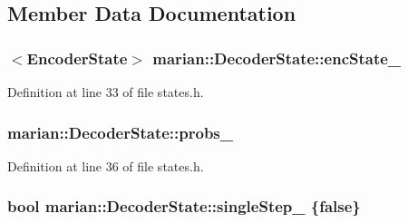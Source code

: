 \subsection{Member Data Documentation}
\subsubsection[{\texorpdfstring{enc\+State\+\_\+}{encState_}}]{$<${\bf Encoder\+State}$>$ marian\+::\+Decoder\+State\+::enc\+State\+\_\+\hspace{0.3cm}{\ttfamily [protected]}}\hypertarget{classmarian_1_1DecoderState_a7e38898678452096207028a0d82c888d}{}\label{classmarian_1_1DecoderState_a7e38898678452096207028a0d82c888d}


Definition at line 33 of file states.\+h.

\subsubsection[{\texorpdfstring{probs\+\_\+}{probs_}}]{ marian\+::\+Decoder\+State\+::probs\+\_\+\hspace{0.3cm}{\ttfamily [protected]}}\hypertarget{classmarian_1_1DecoderState_afc5b2e6aebe1b64a37997344f4be5678}{}\label{classmarian_1_1DecoderState_afc5b2e6aebe1b64a37997344f4be5678}


Definition at line 36 of file states.\+h.

\subsubsection[{\texorpdfstring{single\+Step\+\_\+}{singleStep_}}]{\setlength{\rightskip}{0pt plus 5cm}bool marian\+::\+Decoder\+State\+::single\+Step\+\_\+ \{false\}\hspace{0.3cm}{\ttfamily [protected]}}\hypertarget{classmarian_1_1DecoderState_a6b7abc3679621fab6ae8807214bac9a8}{}\label{classmarian_1_1DecoderState_a6b7abc3679621fab6ae8807214bac9a8}



